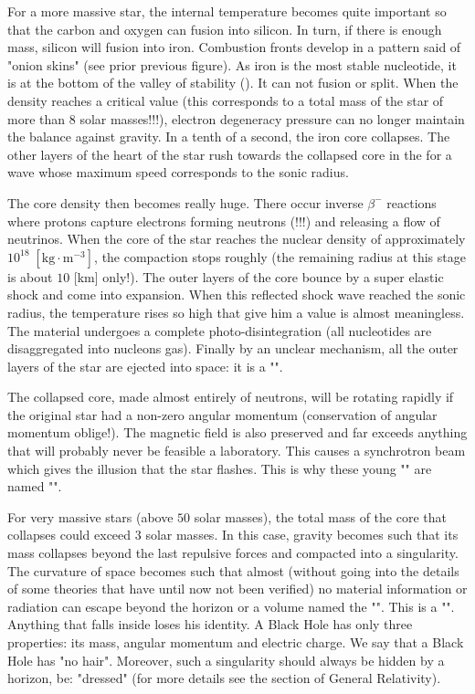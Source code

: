 	For a more massive star, the internal temperature becomes quite important so that the carbon and oxygen can fusion into silicon. In turn, if there is enough mass, silicon will fusion into iron. Combustion fronts develop in a pattern said of "onion skins" (see prior previous figure). As iron is the most stable nucleotide,  it is at the bottom of the valley of stability (). It can not fusion or split. When the density reaches a critical value (this corresponds to a total mass of the star of more than $8$ solar masses!!!), electron degeneracy pressure can no longer maintain the balance against gravity. In a tenth of a second, the iron core collapses. The other layers of the heart of the star rush towards the collapsed core in the for a wave whose maximum speed corresponds to the sonic radius.
	
	The core density then becomes really huge. There occur inverse $\beta^-$ reactions where protons capture electrons forming neutrons (!!!) and releasing a flow of neutrinos. When the core of the star reaches the nuclear density of approximately $10^{18}\;[\text{kg}\cdot\text{m}^{-3}]$, the compaction stops roughly (the remaining radius at this stage is about $10$ [km] only!). The outer layers of the core bounce by a super elastic shock and come into expansion. When this reflected shock wave reached the sonic radius, the temperature rises so high that give him a value is almost meaningless. The material undergoes a complete photo-disintegration (all nucleotides are disaggregated into nucleons gas). Finally by an unclear mechanism, all the outer layers of the star are ejected into space: it is a "".
	
	The collapsed core, made almost entirely of neutrons, will be rotating rapidly if the original star had a non-zero angular momentum (conservation of angular momentum oblige!). The magnetic field is also preserved and far exceeds anything that will probably never be feasible a laboratory. This causes a synchrotron beam which gives the illusion that the star flashes. This is why these young "" are named "".
	
	For very massive stars (above $50$ solar masses), the total mass of the core that collapses could exceed $3$ solar masses. In this case, gravity becomes such that its mass collapses beyond the last repulsive forces and compacted into a singularity. The curvature of space becomes such that almost (without going into the details of some theories that have until now not been verified) no material information or radiation can escape beyond the horizon or a volume named the "". This is a "". Anything that falls inside loses his identity. A Black Hole has only three properties: its mass, angular momentum and electric charge. We say that a Black Hole has "no hair". Moreover, such a singularity should always be hidden by a horizon, be: "dressed" (for more details see the section of General Relativity).
	
